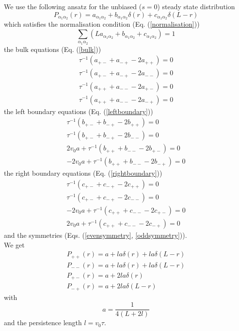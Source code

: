 \documentclass[pre,aps,superscriptaddress,nofootinbib]{revtex4}
\begin{document}
We use the following ansatz for the unbiased ($s = 0$) steady state distribution
\begin{equation}
P_{\alpha_1\alpha_2}(r) = a_{\alpha_1\alpha_2} + b_{\alpha_1\alpha_2} \delta(r) + c_{\alpha_1\alpha_2} \delta(L - r)
\end{equation}
which satisfies the normalisation condition (Eq. (\ref{normalisation}))
\begin{equation}
\sum_{\alpha_1\alpha_2} \left(L a_{\alpha_1\alpha_2} + b_{\alpha_1\alpha_2} + c_{\alpha_1\alpha_2}\right) = 1
\end{equation}
the bulk equations (Eq. (\ref{bulk}))
\begin{eqnarray}
\tau^{-1} (a_{+-} + a_{-+} - 2 a_{++}) = 0\\
\tau^{-1} (a_{+-} + a_{-+} - 2 a_{--}) = 0\\
\tau^{-1} (a_{++} + a_{--} - 2 a_{+-}) = 0\\
\tau^{-1} (a_{++} + a_{--} - 2 a_{-+}) = 0
\end{eqnarray}
the left boundary equations (Eq. (\ref{leftboundary}))
\begin{eqnarray}
\tau^{-1}(b_{+-} + b_{-+} - 2 b_{++}) = 0\\
\tau^{-1}(b_{+-} + b_{-+} - 2 b_{--}) = 0\\
2 v_0 a + \tau^{-1}(b_{++} + b_{--} - 2 b_{+-}) = 0\\
- 2 v_0 a + \tau^{-1}(b_{++} + b_{--} - 2 b_{-+}) = 0
\end{eqnarray}
the right boundary equations (Eq. (\ref{rightboundary}))
\begin{eqnarray}
\tau^{-1}(c_{+-} + c_{-+} - 2 c_{++}) = 0\\
\tau^{-1}(c_{+-} + c_{-+} - 2 c_{--}) = 0\\
- 2 v_0 a + \tau^{-1}(c_{++} + c_{--} - 2 c_{+-}) = 0\\
2 v_0 a + \tau^{-1}(c_{++} + c_{--} - 2 c_{-+}) = 0
\end{eqnarray}
and the symmetries (Eqs. (\ref{evensymmetry}, \ref{oddsymmetry})).\\

We get
\begin{eqnarray}
\label{s0++}
P_{++}(r) = a + l a \delta(r) + l a \delta(L - r)\\
\label{s0--}
P_{--}(r) = a + l a \delta(r) + l a \delta(L - r)\\
\label{s0+-}
P_{+-}(r) = a + 2 l a \delta(r)\\
\label{s0-+}
P_{-+}(r) = a + 2 l a \delta(L - r)
\end{eqnarray}
with
\begin{equation}
a = \frac{1}{4(L + 2l)}
\label{smooth_unbiased}
\end{equation}
and the persistence length $l = v_0 \tau$.
\end{document}
